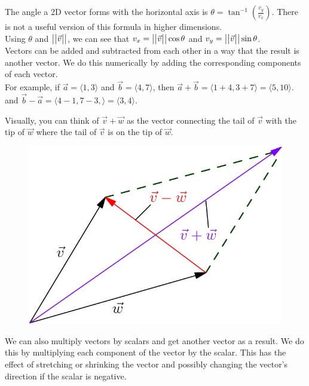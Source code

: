 \noindent
The angle a 2D vector forms with the horizontal axis is $\theta = \tan^{-1}{\left(\frac{v_y}{v_x}\right)}$. There is not a useful version of this formula in higher dimensions.\\
Using $\theta$ and $\big\lvert \big\lvert \vec{v} \big\rvert \big\rvert$, we can see that $v_x = \big\lvert \big\lvert \vec{v} \big\rvert \big\rvert\cos{\theta}$ and $v_y = \big\lvert \big\lvert \vec{v} \big\rvert \big\rvert\sin{\theta}$.\\

\noindent
Vectors can be added and subtracted from each other in a way that the result is another vector. We do this numerically by adding the corresponding components of each vector.\\
For example, if $\vec{a} = \langle 1,3 \rangle$ and $\vec{b} = \langle 4,7 \rangle$, then $\vec{a}+\vec{b} = \langle 1+4, 3+7 \rangle = \langle 5,10 \rangle$.\\
and $\vec{b}-\vec{a} = \langle 4-1, 7-3, \rangle = \langle 3,4 \rangle$.

\noindent
Visually, you can think of $\vec{v}+\vec{w}$ as the vector connecting the tail of $\vec{v}$ with the tip of $\vec{w}$ where the tail of $\vec{v}$ is on the tip of $\vec{w}$.

\begin{figure}[H]
	\centering
	\includegraphics[scale=0.33]{Images/backgroundReview/Parallelogram}
\end{figure}

\noindent
We can also multiply vectors by scalars and get another vector as a result. We do this by multiplying each component of the vector by the scalar. This has the effect of stretching or shrinking the vector and possibly changing the vector's direction if the scalar is negative.

